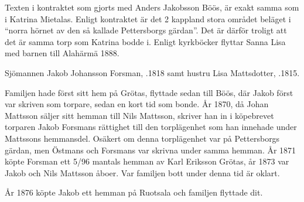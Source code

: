 Texten i kontraktet som gjorts med Anders Jakobsson Böös, är exakt samma som i Katrina Mietalas. Enligt kontraktet är det 2 kappland stora området beläget i ``norra hörnet av den så kallade Pettersborgs gärdan''. Det är därför troligt att det är samma torp som Katrina bodde i. Enligt kyrkböcker flyttar Sanna Lisa med barnen till Alahärmä 1888.
\begin{jhchildren}
  \item {}
  \item {}
  \item {}
\end{jhchildren}


Sjömannen Jakob Johansson Forsman, .1818 samt hustru Lisa Mattsdotter, .1815.
\begin{jhchildren}
  \item {}
  \item {}
  \item {}
\end{jhchildren}
Familjen hade först sitt hem på Grötas, flyttade sedan till Böös, där Jakob först var skriven som torpare, sedan en kort tid som bonde. År 1870, då Johan Mattsson säljer sitt hemman till Nils Mattsson, skriver han in i köpebrevet torparen Jakob Forsmans rättighet till den torplägenhet som han innehade under Mattssons hemmansdel. Osäkert om denna torplägenhet var på Pettersborgs gärdan, men Östmans och Forsmans var skrivna under samma hemman. År 1871 köpte Forsman ett 5/96 mantals hemman av Karl Eriksson Grötas, år 1873 var Jakob och Nils Mattsson åboer. Var familjen bott under denna tid är oklart.

År 1876 köpte Jakob ett hemman på Ruotsala och familjen flyttade dit.






